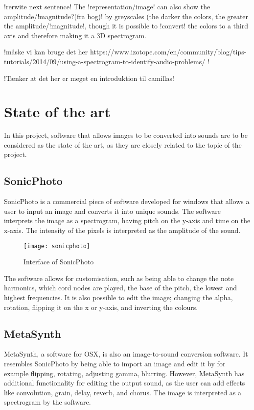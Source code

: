 !rerwite next sentence!
The !representation/image! can also show the amplitude/!magnitude?(fra bog)! by greyscales (the darker the colors, the greater the amplitude/!magnitude!, though it is possible to !convert! the colors to a third axis and therefore making it a 3D spectrogram.   


!måske vi kan bruge det her
https://www.izotope.com/en/community/blog/tips-tutorials/2014/09/using-a-spectrogram-to-identify-audio-problems/
!

!Tænker at det her er meget en introduktion til camillas!


\section{State of the art}\label{sec:stateart}
In this project, software that allows images to be converted into sounds are to be considered as the state of the art, as they are closely related to the topic of the project.

\subsection{SonicPhoto}\label{sub:sonic}
SonicPhoto \cite{White2013} is a commercial piece of software developed for windows that allows a user to input an image and converts it into unique sounds. The software interprets the image as a spectrogram, having pitch on the y-axis and time on the x-axis. The intensity of the pixels is interpreted as the amplitude of the sound. 

\begin{figure}[!h] 
\centering
\texttt{[image: sonicphoto]}
\caption{\label{fig:sonicphoto} Interface of SonicPhoto \cite{White2013}}
\end{figure}

The software allows for customisation, such as being able to change the note harmonics, which cord nodes are played, the base of the pitch, the lowest and highest frequencies. It is also possible to edit the image; changing the alpha, rotation, flipping it on the x or y-axis, and inverting the colours. 


\subsection{MetaSynth}\label{sub:metasynth}
MetaSynth, a software for OSX, is also an image-to-sound conversion software. It resembles SonicPhoto by being able to import an image and edit it by for example flipping, rotating, adjusting gamma, blurring. However, MetaSynth has additional functionality for editing the output sound, as the user can add effects like  convolution, grain, delay, reverb, and chorus. The image is interpreted as a spectrogram by the software.

